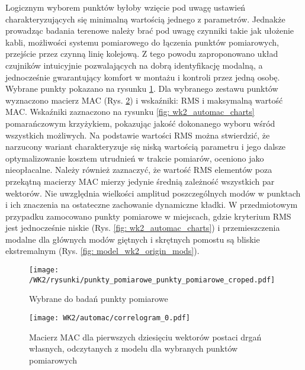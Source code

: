 Logicznym wyborem punktów byłoby wzięcie pod uwagę ustawień charakteryzujących się minimalną wartością jednego z parametrów. Jednakże prowadząc badania terenowe należy brać pod uwagę czynniki takie jak ułożenie kabli, możliwości systemu pomiarowego do łączenia punktów pomiarowych, przejście przez czynną linię kolejową. Z tego powodu zaproponowano układ czujników intuicyjnie pozwalających na dobrą identyfikację modalną, a jednocześnie gwarantujący komfort w montażu i kontroli przez jedną osobę. Wybrane punkty pokazano na rysunku \ref{fig: wk2_automac_points_choosen}. Dla wybranego zestawu punktów wyznaczono macierz MAC (Rys. \ref{fig: wk2_automac_correlogram}) i wskaźniki: RMS i maksymalną wartość MAC. Wskaźniki zaznaczono na rysunku \ref{fig: wk2_automac_charts} pomarańczowym krzyżykiem, pokazując jakość dokonanego wyboru wśród wszystkich możliwych. Na podstawie wartości RMS można stwierdzić, że narzucony wariant charakteryzuje się niską wartością parametru i jego dalsze optymalizowanie kosztem utrudnień w trakcie pomiarów, oceniono jako nieopłacalne. Należy również zaznaczyć, że wartość RMS elementów poza przekątną macierzy MAC mierzy jedynie średnią zależność wszystkich par wektorów. Nie uwzględnia wielkości amplitud poszczególnych modów w punktach i ich znaczenia na ostateczne zachowanie dynamiczne kładki. W przedmiotowym przypadku zamocowano punkty pomiarowe w miejscach, gdzie kryterium RMS jest jednocześnie niskie (Rys. \ref{fig: wk2_automac_charts}) i przemieszczenia modalne dla głównych modów giętnych i skrętnych pomostu są bliskie ekstremalnym (Rys. \ref{fig: model_wk2_origin_mods}).




\begin{figure}[h]
	\centering
	\texttt{[image: /WK2/rysunki/punkty\_pomiarowe\_punkty\_pomiarowe\_croped.pdf]}
	\captionsetup{justification=centering}
	\caption{Wybrane do badań punkty pomiarowe}
	\label{fig: wk2_automac_points_choosen}
\end{figure}





\begin{figure}[H]
	\centering
	\texttt{[image: WK2/automac/correlogram\_0.pdf]}
	\captionsetup{justification=centering}
	\caption{Macierz MAC dla pierwszych dziesięciu wektorów postaci drgań własnych, odczytanych z modelu dla wybranych punktów pomiarowych}
	\label{fig: wk2_automac_correlogram}
\end{figure}


